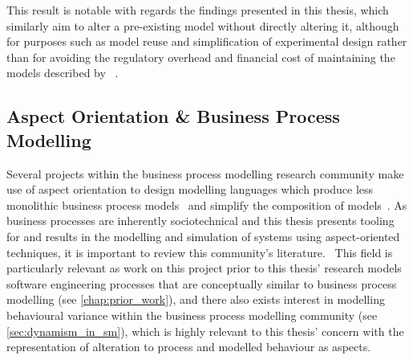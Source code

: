 This result is notable with regards the findings presented in this thesis, which
similarly aim to alter a pre-existing model without directly altering it,
although for purposes such as model reuse and simplification of experimental
design rather than for avoiding the regulatory overhead and financial cost of
maintaining the models described by
\citeauthor{ionescu2009aspect}~\cite{ionescu2009aspect}.



\subsection{Aspect Orientation \& Business Process Modelling}\label{subsec:ao_and_bpm_review}



Several projects within the business process modelling research community make
use of aspect orientation to design modelling languages which produce less
monolithic business process models~\cite{Cappelli_AOBPM,da2020implementation}
and simplify the composition of models~\cite{charfi2007ao4bpel}. As business
processes are inherently sociotechnical and this thesis presents tooling for and
results in the modelling and simulation of \sociotechnical systems using
aspect-oriented techniques, it is important to review this community's
literature.~ This field is particularly relevant as work on this project prior to
this thesis' research models software engineering processes that are
conceptually similar to business process modelling (see \cref{chap:prior_work}),
and there also exists interest in modelling behavioural variance within the
business process modelling community (see \cref{sec:dynamism_in_sm}), which is
highly relevant to this thesis' concern with the representation of alteration to
process and modelled behaviour as aspects.

